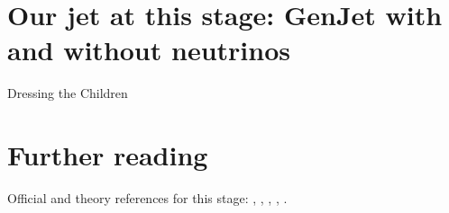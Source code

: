 \section{Our jet at this stage: GenJet with and without neutrinos}
\label{sec:dressing_children:our_jet_at_this_stage_genjet_with_and_wi}

\begin{ledger}{Dressing the Children}
\end{ledger}

\section{Further reading}
\label{sec:dressing_children:further_reading}
Official and theory references for this stage: \cite{Andersson:1983ia}, \cite{Peterson:1982ak}, \cite{Bowler:1981sb}, \cite{Lange:2001uf}, \cite{ALEPH:2001pfo}.

\begin{pitfalls}
\end{pitfalls}

\begin{exercises}
\item {}
\item {}
\end{exercises}

